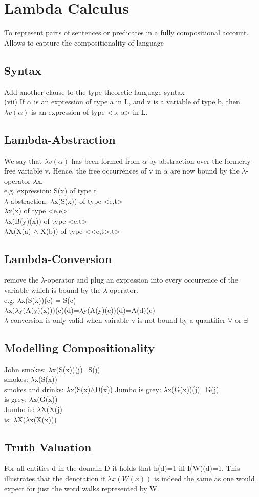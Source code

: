 \section{Lambda Calculus}
To represent parts of sentences or predicates in a fully compositional account. Allows to capture the compositionality of language
\subsection*{Syntax}
Add another clause to the type-theoretic language syntax \\
(vii) If $\alpha$ is an expression of type a in L, and v is a variable of
type b, then $\lambda v(\alpha)$ is an expression of type <b, a> in L.
\subsection*{Lambda-Abstraction}
We say that $\lambda v(\alpha)$ has been formed from $\alpha$ by abstraction
over the formerly free variable v. Hence, the free
occurrences of v in $\alpha$ are now bound by the $\lambda$-operator $\lambda$x. \\
e.g. expression: S(x) of type t \\
$\lambda$-abstraction: $\lambda$x(S(x)) of type <e,t> \\
$\lambda$x(x) of type <e,e> \\
$\lambda$x(B(y)(x)) of type <e,t> \\
$\lambda$X(X(a) $\land$ X(b)) of type <<e,t>,t> \\
\subsection*{Lambda-Conversion}
remove the $\lambda$-operator and plug an expression into every occurrence of the variable which is bound by the $\lambda$-operator. \\
e.g. $\lambda$x(S(x))(c) = S(c) \\
$\lambda$x($\lambda$y(A(y)(x)))(c)(d)=$\lambda$y(A(y)(c))(d)=A(d)(c)\\
$\lambda$-conversion is only valid when vairable v is not bound by a quantifier $\forall$ or $\exists$
\subsection*{Modelling Compositionality}
John smokes: $\lambda$x(S(x))(j)=S(j)\\
smokes: $\lambda$x(S(x))\\
smokes and drinks: $\lambda$x(S(x)$\land$D(x))
Jumbo is grey: $\lambda$x(G(x))(j)=G(j) \\
is grey: $\lambda$x(G(x)) \\
Jumbo is: $\lambda$X(X(j) \\
is: $\lambda$X($\lambda$x(X(x))) 
\subsection*{Truth Valuation}
For all entities d in the domain D it holds that h(d)=1 iff I(W)(d)=1. This illustrates that the denotation if $\lambda x(W(x))$ is indeed the same as one would expect for just the word walks represented by W.